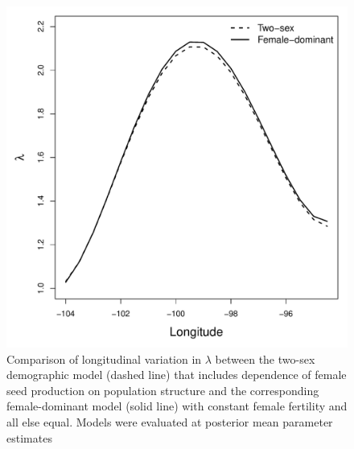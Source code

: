 \documentclass[11pt]{article}
\begin{document}
\newpage
\begin{figure}[H]
	\begin{center}
		\includegraphics[width=0.75\linewidth]{Figures/lambda_long_2sex_Fdom}
		\caption{Comparison of longitudinal variation in $\lambda$ between the two-sex demographic model (dashed line) that includes dependence of female seed production on population structure and the corresponding female-dominant model (solid line) with constant female fertility and all else equal. 
			Models were evaluated at posterior mean parameter estimates}
		\label{fig:2sex_Fdom}
	\end{center}
\end{figure}
\end{document}
